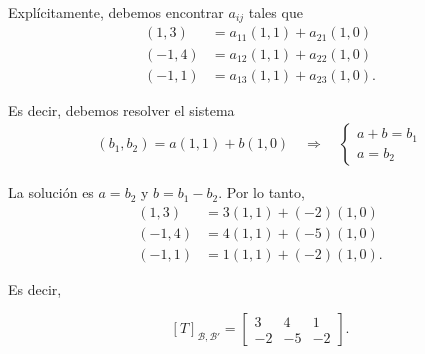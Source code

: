 \documentclass[handout]{beamer} %
\newcommand{\cB}{\mathcal{B}}
\begin{document}
        \begin{frame}

            Explícitamente, debemos encontrar $a_{ij}$ tales que
            \begin{align*}
                (1,3) &= a_{11}(1,1) + a_{21}(1,0)\\
                (-1,4) &= a_{12}(1,1) + a_{22}(1,0)\\
                (-1,1) &= a_{13}(1,1) + a_{23}(1,0).
            \end{align*}

            \pause
            Es decir, debemos resolver el sistema
            \begin{align*}
                (b_1, b_2) = a(1,1) + b(1,0) \quad \Rightarrow \quad \begin{cases}
                    a + b = b_1\\
                    a = b_2 
                \end{cases}
            \end{align*}

            La solución es $a = b_2$ y $b = b_1 - b_2$. Por lo tanto,
            \begin{align*}
                (1,3) &=3(1,1) + (-2)(1,0)\\
                (-1,4) &= 4(1,1) + (-5)(1,0)\\
                (-1,1) &= 1(1,1) + (-2)(1,0).
            \end{align*}


        \end{frame}




    \begin{frame}
        Es decir, 

        $$
        [T]_{\cB,\cB'} = \begin{bmatrix}
            3&4&1\\ -2&-5&-2
        \end{bmatrix}.
        $$

        \vskip 5cm

    \end{frame}
\end{document}
